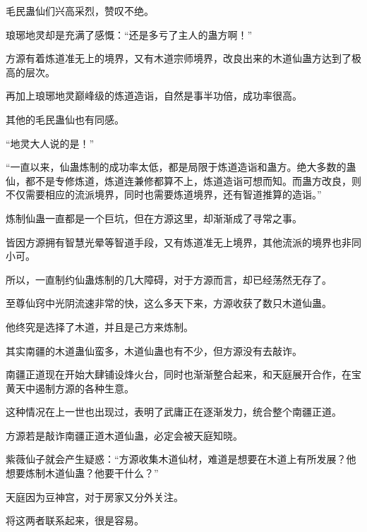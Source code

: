 \begin{this_body}
毛民蛊仙们兴高采烈，赞叹不绝。

琅琊地灵却是充满了感慨：“还是多亏了主人的蛊方啊！”

方源有着炼道准无上的境界，又有木道宗师境界，改良出来的木道仙蛊方达到了极高的层次。

再加上琅琊地灵巅峰级的炼道造诣，自然是事半功倍，成功率很高。

其他的毛民蛊仙也有同感。

“地灵大人说的是！”

“一直以来，仙蛊炼制的成功率太低，都是局限于炼道造诣和蛊方。绝大多数的蛊仙，都不是专修炼道，炼道连兼修都算不上，炼道造诣可想而知。而蛊方改良，则不仅需要相应的流派境界，同时也需要炼道境界，还有智道推算的造诣。”

炼制仙蛊一直都是一个巨坑，但在方源这里，却渐渐成了寻常之事。

皆因方源拥有智慧光晕等智道手段，又有炼道准无上境界，其他流派的境界也非同小可。

所以，一直制约仙蛊炼制的几大障碍，对于方源而言，却已经荡然无存了。

至尊仙窍中光阴流速非常的快，这么多天下来，方源收获了数只木道仙蛊。

他终究是选择了木道，并且是己方来炼制。

其实南疆的木道蛊仙蛮多，木道仙蛊也有不少，但方源没有去敲诈。

南疆正道现在开始大肆铺设烽火台，同时也渐渐整合起来，和天庭展开合作，在宝黄天中遏制方源的各种生意。

这种情况在上一世也出现过，表明了武庸正在逐渐发力，统合整个南疆正道。

方源若是敲诈南疆正道木道仙蛊，必定会被天庭知晓。

紫薇仙子就会产生疑惑：“方源收集木道仙材，难道是想要在木道上有所发展？他想要炼制木道仙蛊？他要干什么？”

天庭因为豆神宫，对于房家又分外关注。

将这两者联系起来，很是容易。

\end{this_body}

